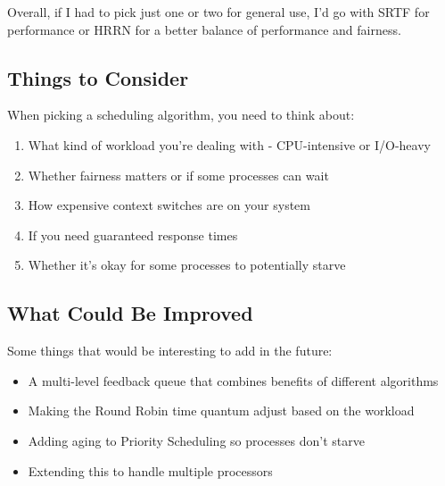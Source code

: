 \documentclass[12pt,letterpaper]{article}
\begin{document}
Overall, if I had to pick just one or two for general use, I'd go with SRTF for 
performance or HRRN for a better balance of performance and fairness.

\subsection{Things to Consider}

When picking a scheduling algorithm, you need to think about:

\begin{enumerate}
    \item What kind of workload you're dealing with - CPU-intensive or I/O-heavy
    \item Whether fairness matters or if some processes can wait
    \item How expensive context switches are on your system
    \item If you need guaranteed response times
    \item Whether it's okay for some processes to potentially starve
\end{enumerate}

\subsection{What Could Be Improved}

Some things that would be interesting to add in the future:

\begin{itemize}
    \item A multi-level feedback queue that combines benefits of different algorithms
    \item Making the Round Robin time quantum adjust based on the workload
    \item Adding aging to Priority Scheduling so processes don't starve
    \item Extending this to handle multiple processors
\end{itemize}

\newpage
\end{document}

